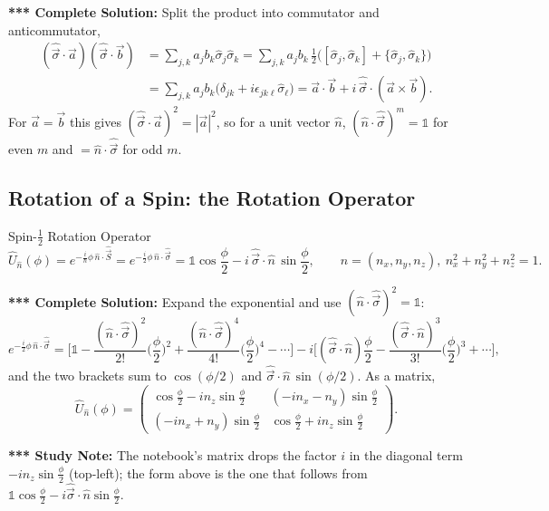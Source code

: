 \documentclass[11pt,a4paper]{article}
\begin{document}
\textbf{*** Complete Solution:} Split the product into commutator and anticommutator,
\begin{align*}
(\hat{\vec\sigma}\cdot\vec a)(\hat{\vec\sigma}\cdot\vec b)&=\sum_{j,k}a_jb_k\hat\sigma_j\hat\sigma_k=\sum_{j,k}a_jb_k\,\tfrac12\Big([\hat\sigma_j,\hat\sigma_k]+\{\hat\sigma_j,\hat\sigma_k\}\Big)\\
&=\sum_{j,k}a_jb_k\big(\delta_{jk}+i\epsilon_{jk\ell}\hat\sigma_\ell\big)=\vec a\cdot\vec b+i\,\hat{\vec\sigma}\cdot(\vec a\times\vec b).
\end{align*}
For $\vec a=\vec b$ this gives $(\hat{\vec\sigma}\cdot\vec a)^2=|\vec a|^2$, so for a unit vector $\hat n$, $(\hat n\cdot\hat{\vec\sigma})^m=\mathbb 1$ for even $m$ and $=\hat n\cdot\hat{\vec\sigma}$ for odd $m$.

\subsection{Rotation of a Spin: the Rotation Operator}
\begin{thm}{Spin-$\tfrac12$ Rotation Operator}
\[
\hat U_{\hat n}(\phi)=e^{-\frac i\hbar\phi\,\hat n\cdot\hat{\vec S}}=e^{-\frac i2\phi\,\hat n\cdot\hat{\vec\sigma}}=\mathbb 1\cos\frac\phi2-i\,\hat{\vec\sigma}\cdot\hat n\,\sin\frac\phi2,\qquad \hat n=(n_x,n_y,n_z),\ n_x^2+n_y^2+n_z^2=1 .
\]
\end{thm}

\textbf{*** Complete Solution:} Expand the exponential and use $(\hat n\cdot\hat{\vec\sigma})^2=\mathbb 1$:
\[
e^{-\frac i2\phi\,\hat n\cdot\hat{\vec\sigma}}=\Big[\mathbb 1-\frac{(\hat n\cdot\hat{\vec\sigma})^2}{2!}\Big(\frac\phi2\Big)^2+\frac{(\hat n\cdot\hat{\vec\sigma})^4}{4!}\Big(\frac\phi2\Big)^4-\cdots\Big]-i\Big[(\hat{\vec\sigma}\cdot\hat n)\frac\phi2-\frac{(\hat{\vec\sigma}\cdot\hat n)^3}{3!}\Big(\frac\phi2\Big)^3+\cdots\Big],
\]
and the two brackets sum to $\cos(\phi/2)$ and $\hat{\vec\sigma}\cdot\hat n\,\sin(\phi/2)$. As a matrix,
\[
\hat U_{\hat n}(\phi)=\begin{pmatrix}\cos\frac\phi2-in_z\sin\frac\phi2&(-in_x-n_y)\sin\frac\phi2\\(-in_x+n_y)\sin\frac\phi2&\cos\frac\phi2+in_z\sin\frac\phi2\end{pmatrix}.
\]

\textbf{*** Study Note:} The notebook's matrix drops the factor $i$ in the diagonal term $-in_z\sin\frac\phi2$ (top-left); the form above is the one that follows from $\mathbb 1\cos\frac\phi2-i\hat{\vec\sigma}\cdot\hat n\sin\frac\phi2$.
\end{document}
